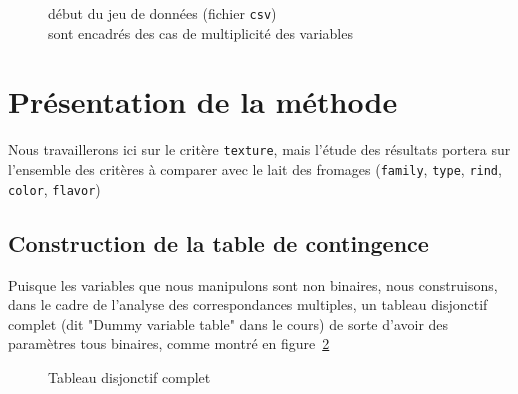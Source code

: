 \documentclass[12pt]{article}
\newcommand{\code}{\texttt}
\begin{document}
\begin{figure}[H]
    
    \caption{début du jeu de données (fichier \code{csv})\\\small sont encadrés des cas de multiplicité des variables}
    \label{fig:csv-plusieurs-valeurs}
\end{figure}

\section{Présentation de la méthode}
Nous travaillerons ici sur le critère \code{texture}, mais l'étude des résultats portera sur l'ensemble des critères à comparer avec le lait des fromages (\code{family}, \code{type}, \code{rind}, \code{color}, \code{flavor})

\subsection{Construction de la table de contingence}

Puisque les variables que nous manipulons sont non binaires, nous construisons, dans le cadre de l'analyse des correspondances multiples, un tableau disjonctif complet (dit "Dummy variable table" dans le cours) de sorte d'avoir des paramètres tous binaires, comme montré en figure~\ref{fig:dummy-table}

\begin{figure}[H]
    
    \caption{Tableau disjonctif complet}
    \label{fig:dummy-table}
\end{figure}


\newpage
\printbibliography
\end{document}
